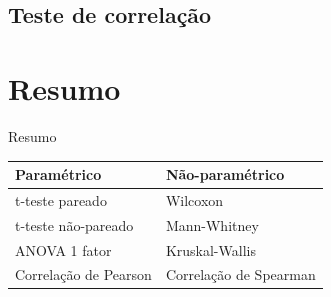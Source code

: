 \documentclass{beamer}
\begin{document}
\subsection[Correlação]{Teste de correlação}

\section{Resumo}

\begin{frame}{Resumo}
  \begin{tabular}{||l||l||}
    \hline
    Paramétrico & Não-paramétrico\\
    \hline
    \hline
    t-teste pareado & Wilcoxon\\
    \hline
    t-teste não-pareado & Mann-Whitney\\
    \hline
    ANOVA 1 fator & Kruskal-Wallis\\
    \hline
    Correlação de Pearson & Correlação de Spearman\\
    \hline
  \end{tabular}

\end{frame}
\end{document}
